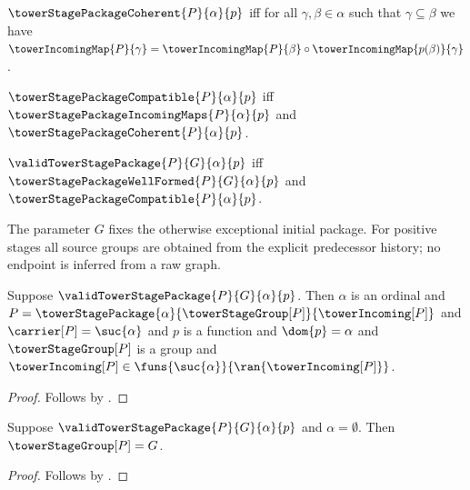 \begin{definition}\label{tower_stage_package_coherent}
    $\towerStagePackageCoherent{P}{\alpha}{p}$ iff
        for all $\gamma,\beta\in\alpha$ such that
            $\gamma\subseteq\beta$ we have
            $\towerIncomingMap{P}{\gamma}=
                \towerIncomingMap{P}{\beta}\circ
                \towerIncomingMap{p(\beta)}{\gamma}$.
\end{definition}

\begin{definition}\label{tower_stage_package_compatible}
    $\towerStagePackageCompatible{P}{\alpha}{p}$ iff
        $\towerStagePackageIncomingMaps{P}{\alpha}{p}$ and
        $\towerStagePackageCoherent{P}{\alpha}{p}$.
\end{definition}

\begin{definition}\label{valid_tower_stage_package}
    $\validTowerStagePackage{P}{G}{\alpha}{p}$ iff
        $\towerStagePackageWellFormed{P}{G}{\alpha}{p}$ and
        $\towerStagePackageCompatible{P}{\alpha}{p}$.
\end{definition}

The parameter $G$ fixes the otherwise exceptional initial package.  For
positive stages all source groups are obtained from the explicit predecessor
history; no endpoint is inferred from a raw graph.

\begin{proposition}\label{valid_tower_stage_package_data}
    Suppose $\validTowerStagePackage{P}{G}{\alpha}{p}$.
    Then $\alpha$ is an ordinal and
        $P=\towerStagePackage{\alpha}
            {\towerStageGroup[P]}{\towerIncoming[P]}$ and
        $\carrier[P]=\suc{\alpha}$ and
        $p$ is a function and $\dom{p}=\alpha$ and
        $\towerStageGroup[P]$ is a group and
        $\towerIncoming[P]\in
            \funs{\suc{\alpha}}{\ran{\towerIncoming[P]}}$.
\end{proposition}
\begin{proof}
    Follows by
        .
\end{proof}

\begin{proposition}\label{valid_tower_stage_package_base}
    Suppose $\validTowerStagePackage{P}{G}{\alpha}{p}$ and
        $\alpha=\emptyset$.
    Then $\towerStageGroup[P]=G$.
\end{proposition}
\begin{proof}
    Follows by
        .
\end{proof}

